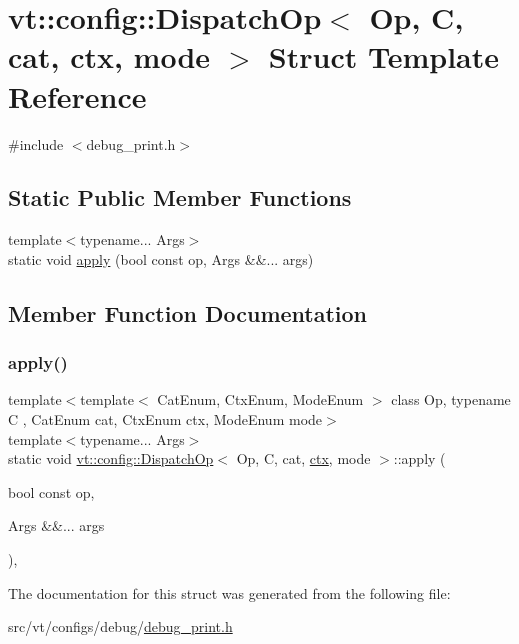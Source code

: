 \hypertarget{structvt_1_1config_1_1_dispatch_op}{}\section{vt\+:\+:config\+:\+:Dispatch\+Op$<$ Op, C, cat, ctx, mode $>$ Struct Template Reference}
\label{structvt_1_1config_1_1_dispatch_op}


{\ttfamily \#include $<$debug\+\_\+print.\+h$>$}

\subsection*{Static Public Member Functions}
\begin{DoxyCompactItemize}
\item 
{\footnotesize template$<$typename... Args$>$ }\\static void \hyperlink{structvt_1_1config_1_1_dispatch_op_a1ce38d485a91d3650104cc822d1810c5}{apply} (bool const op, Args \&\&... args)
\end{DoxyCompactItemize}


\subsection{Member Function Documentation}
\mbox{\label{structvt_1_1config_1_1_dispatch_op_a1ce38d485a91d3650104cc822d1810c5}} 
\subsubsection{\texorpdfstring{apply()}{apply()}}
{\footnotesize\ttfamily template$<$template$<$ Cat\+Enum, Ctx\+Enum, Mode\+Enum $>$ class Op, typename C , Cat\+Enum cat, Ctx\+Enum ctx, Mode\+Enum mode$>$ \\
template$<$typename... Args$>$ \\
static void \hyperlink{structvt_1_1config_1_1_dispatch_op}{vt\+::config\+::\+Dispatch\+Op}$<$ Op, C, cat, \hyperlink{namespacevt_1_1config_a0551245b6b893932b95aaf8eac94eed1}{ctx}, mode $>$\+::apply (\begin{DoxyParamCaption}\item[{bool const}]{op,  }\item[{Args \&\&...}]{args }\end{DoxyParamCaption})\hspace{0.3cm}{\ttfamily [inline]}, {\ttfamily [static]}}



The documentation for this struct was generated from the following file\+:\begin{DoxyCompactItemize}
\item 
src/vt/configs/debug/\hyperlink{debug__print_8h}{debug\+\_\+print.\+h}\end{DoxyCompactItemize}
